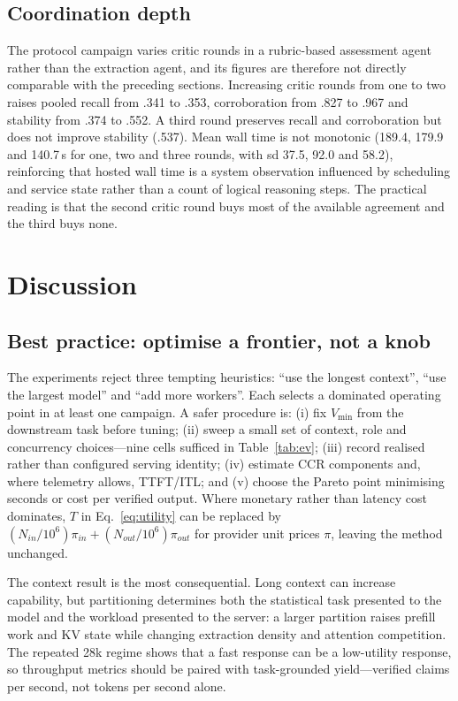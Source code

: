 \documentclass[conference]{IEEEtran}
\begin{document}
\subsection{Coordination depth}
The protocol campaign varies critic rounds in a rubric-based assessment agent rather than the extraction agent, and its figures are therefore not directly comparable with the preceding sections. Increasing critic rounds from one to two raises pooled recall from .341 to .353, corroboration from .827 to .967 and stability from .374 to .552. A third round preserves recall and corroboration but does not improve stability (.537). Mean wall time is not monotonic (189.4, 179.9 and 140.7\,s for one, two and three rounds, with sd 37.5, 92.0 and 58.2), reinforcing that hosted wall time is a system observation influenced by scheduling and service state rather than a count of logical reasoning steps. The practical reading is that the second critic round buys most of the available agreement and the third buys none.

\section{Discussion}
\subsection{Best practice: optimise a frontier, not a knob}
The experiments reject three tempting heuristics: ``use the longest context'', ``use the largest model'' and ``add more workers''. Each selects a dominated operating point in at least one campaign. A safer procedure is: (i) fix $V_{\min}$ from the downstream task before tuning; (ii) sweep a small set of context, role and concurrency choices---nine cells sufficed in Table~\ref{tab:ev}; (iii) record realised rather than configured serving identity; (iv) estimate CCR components and, where telemetry allows, TTFT/ITL; and (v) choose the Pareto point minimising seconds or cost per verified output. Where monetary rather than latency cost dominates, $T$ in Eq.~\ref{eq:utility} can be replaced by $(N_{in}/10^6)\pi_{in}+(N_{out}/10^6)\pi_{out}$ for provider unit prices $\pi$, leaving the method unchanged.

The context result is the most consequential. Long context can increase capability, but partitioning determines both the statistical task presented to the model and the workload presented to the server: a larger partition raises prefill work and KV state while changing extraction density and attention competition. The repeated 28k regime shows that a fast response can be a low-utility response, so throughput metrics should be paired with task-grounded yield---verified claims per second, not tokens per second alone.
\end{document}
